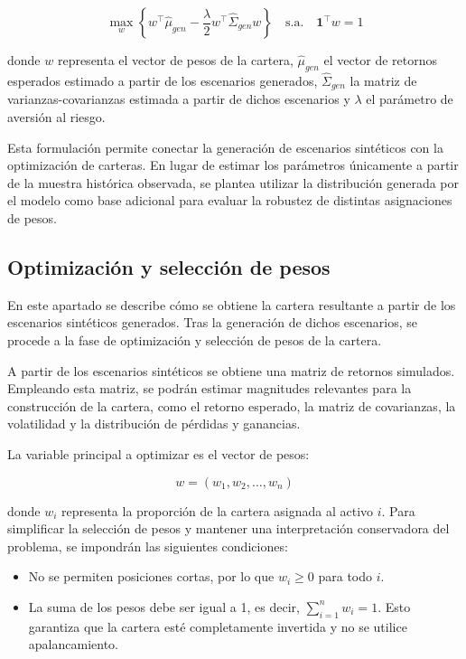\begin{equation}
\max_{w}
\left\{
w^{\top}\hat{\mu}_{gen}
-
\frac{\lambda}{2}
w^{\top}\hat{\Sigma}_{gen}w
\right\}
\quad
\text{s.a.}
\quad
\mathbf{1}^{\top}w = 1
\end{equation}

donde $w$ representa el vector de pesos de la cartera, $\hat{\mu}_{gen}$ el vector de retornos esperados estimado a partir de los escenarios generados, $\hat{\Sigma}_{gen}$ la matriz de varianzas-covarianzas estimada a partir de dichos escenarios y $\lambda$ el parámetro de aversión al riesgo.

Esta formulación permite conectar la generación de escenarios sintéticos con la optimización de carteras. En lugar de estimar los parámetros únicamente a partir de la muestra histórica observada, se plantea utilizar la distribución generada por el modelo como base adicional para evaluar la robustez de distintas asignaciones de pesos.

\subsection{Optimización y selección de pesos}

En este apartado se describe cómo se obtiene la cartera resultante a partir de los escenarios sintéticos generados. Tras la generación de dichos escenarios, se procede a la fase de optimización y selección de pesos de la cartera.

A partir de los escenarios sintéticos se obtiene una matriz de retornos simulados. Empleando esta matriz, se podrán estimar magnitudes relevantes para la construcción de la cartera, como el retorno esperado, la matriz de covarianzas, la volatilidad y la distribución de pérdidas y ganancias.

La variable principal a optimizar es el vector de pesos:

\begin{equation}
w = (w_1, w_2, \ldots, w_n)
\end{equation}

donde $w_i$ representa la proporción de la cartera asignada al activo $i$. Para simplificar la selección de pesos y mantener una interpretación conservadora del problema, se impondrán las siguientes condiciones:

\begin{itemize}
\item No se permiten posiciones cortas, por lo que $w_i \geq 0$ para todo $i$.
\item La suma de los pesos debe ser igual a 1, es decir, $\sum_{i=1}^{n} w_i = 1$. Esto garantiza que la cartera esté completamente invertida y no se utilice apalancamiento.
\end{itemize}

